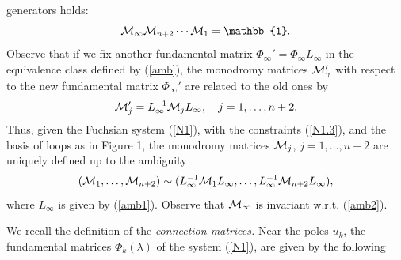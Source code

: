 \documentclass[12pt]{article}
\newcommand{\ID}{\mathbb{1}}
\theoremstyle{definition}
\theoremstyle{theorem}
\begin{document}
generators holds:
\begin{equation}
{\cal M}_\infty {\cal M}_{n+2} \cdots {\cal M}_1=\ID.
\label{N6}
\end{equation}
Observe that if we fix another fundamental matrix 
$\Phi_\infty'=\Phi_\infty L_\infty$ in the equivalence class defined 
by (\ref{amb}), the monodromy matrices ${\cal M}_\gamma'$ with
respect to the new fundamental matrix $\Phi_\infty'$ are related to
the old ones by
\begin{equation}
{\cal M}_j'= L_\infty^{-1}{\cal M}_jL_\infty,\quad
j=1,\dots,n+2.
\end{equation}
Thus, given the Fuchsian system (\ref{N1}), with the constraints
(\ref{N1.3}), and the basis of loops as in Figure 1, the monodromy 
matrices ${\cal M}_j$, $j=1,\dots,n+2$ are uniquely defined up to 
the ambiguity
\begin{equation}
({\cal M}_1, \dots, {\cal M}_{n+2})\sim
(L_\infty^{-1}{\cal M}_1L_\infty, \dots,
L_\infty^{-1}{\cal M}_{n+2}L_\infty),
\label{amb2}
\end{equation}
where $L_\infty$ is given by (\ref{amb1}). Observe that ${\cal M}_\infty$ 
is invariant w.r.t. (\ref{amb2}).

We recall the definition of the {\it connection matrices.}\/ Near the poles 
$u_k$, the fundamental matrices $\Phi_k(\lambda)$ of the 
system (\ref{N1}), are given by the following

\end{document}
